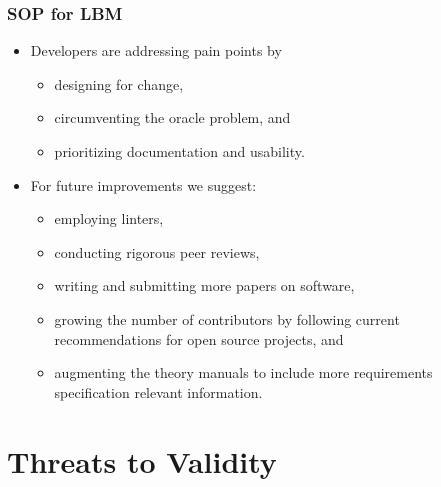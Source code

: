 \documentclass[usenames,dvipsnames]{beamer}
\begin{document}

\begin{frame}

  \frametitle{SOP for LBM}

  \begin{itemize}
    \item Developers are addressing pain points by
    \begin{itemize}
      \item designing for change,  
      \item circumventing the oracle problem, and 
      \item prioritizing documentation and usability.
    \end{itemize}  
    \item For future improvements we suggest:
    \begin{itemize}
      \item employing linters, 
      \item conducting rigorous peer reviews, 
      \item writing and submitting more papers on software, 
      \item growing the number of contributors by following current
      recommendations for open source projects, and 
      \item augmenting the theory manuals to include more requirements
      specification relevant information.
    \end{itemize} 
  \end{itemize}

\end{frame}
  

\section[Threats]{Threats to Validity}

\end{document}
